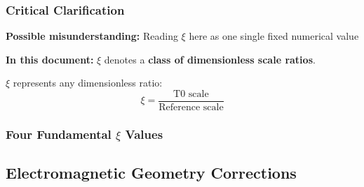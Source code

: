 	\subsubsection{Critical Clarification}
	\label{subsubsec:critical_clarification}
	
	\begin{tcolorbox}[colback=red!10!white,colframe=red!75!black,title=Clarification: Use of the Symbol $\xi$ in This Document,breakable]
		\textbf{Possible misunderstanding:} Reading $\xi$ here as one single fixed numerical value
		
		\textbf{In this document:} $\xi$ denotes a \textbf{class of dimensionless scale ratios}.
		
		$\xi$ represents any dimensionless ratio:
		\begin{equation}
			\xi = \frac{\text{T0 scale}}{\text{Reference scale}}
		\end{equation}
	\end{tcolorbox}
	
	\subsubsection{Four Fundamental $\xi$ Values}
	\label{subsubsec:four_fundamental_values}
	
	\begin{table}[htbp]
		\centering
		\caption{The four fundamental $\xi$ parameter values}
		\label{tab:four_xi_values}
	\end{table}
	
	\subsection{Electromagnetic Geometry Corrections}
	\label{subsec:em_corrections}
	
